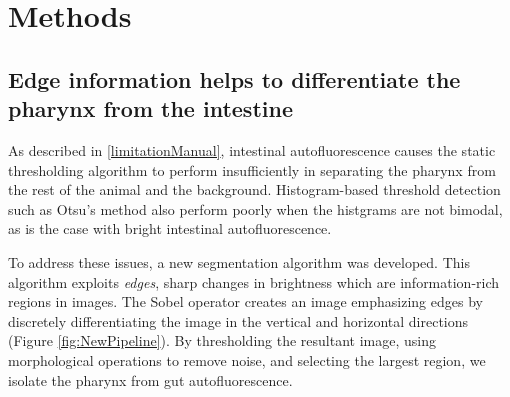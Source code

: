 
\chapter{Methods} %

\label{Chapter2} %


\section{Edge information helps to differentiate the pharynx from the intestine} \label{segMethod}

As described in \ref{limitationManual}, intestinal autofluorescence causes the static thresholding algorithm to perform insufficiently in separating the pharynx from the rest of the animal and the background. Histogram-based threshold detection such as Otsu's method also perform poorly when the histgrams are not bimodal, as is the case with bright intestinal autofluorescence.

To address these issues, a new segmentation algorithm was developed. This algorithm exploits \textit{edges}, sharp changes in brightness which are information-rich regions in images. The Sobel operator creates an image emphasizing edges by discretely differentiating the image in the vertical and horizontal directions (Figure \ref{fig:NewPipeline}). By thresholding the resultant image, using morphological operations to remove noise, and selecting the largest region, we isolate the pharynx from gut autofluorescence.

